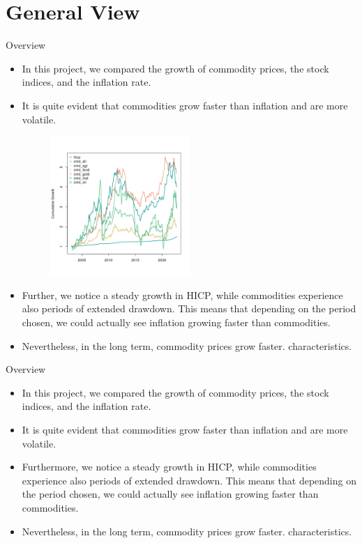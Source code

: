\section{General View}
    \begin{frame}{Overview}
    \begin{itemize}
     \item<1-> In this project, we compared the growth of commodity prices, the stock indices, and the inflation rate.
     \item<2-> It is quite evident that commodities grow faster than inflation and are more volatile.
      {\begin{figure}[h]\includegraphics[width=0.5\textwidth]{../../figures/cumgrowth.png}\end{figure}}
     \item<3> Further, we notice a steady growth in HICP, while commodities experience also periods of extended drawdown. This means that depending on the period chosen, we could actually see inflation growing faster than commodities. 
     \item<3> Nevertheless, in the long term, commodity prices grow faster. 
characteristics.
    \end{itemize}
    \end{frame}
    
    \begin{frame}{Overview}
    \begin{itemize}
     \item<1-> In this project, we compared the growth of commodity prices, the stock indices, and the inflation rate.
     \item<1-> It is quite evident that commodities grow faster than inflation and are more volatile.
     \item<1-> Furthermore, we notice a steady growth in HICP, while commodities experience also periods of extended drawdown. This means that depending on the period chosen, we could actually see inflation growing faster than commodities. 
     \item<1-> Nevertheless, in the long term, commodity prices grow faster. 
characteristics.
    \end{itemize}
    \end{frame}
 
